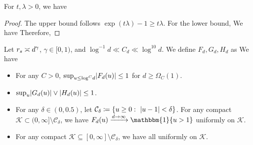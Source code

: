 \begin{proposition}
\label{prop:auxbound}
For $t, \lambda > 0$, we have
\end{proposition}

\begin{proof}
The upper bound follows  $\exp(t \lambda) - 1 \geq t \lambda$. For the lower bound,
We have
Therefore,
\end{proof}


 

\begin{lemma}
\label{lem:asympkernel}
Let $r_s \asymp d^{\gamma}$, $\gamma \in [0,1)$, and $\log^{-1} d \ll C_d \ll \log^{10} d $.  We define   $F_d, G_d, H_d$ as
  We have
\begin{itemize}
\item For any $C > 0$,   $ \sup_{u \leq \log^{C} \! d}  \lvert F_d(u)  \rvert \leq 1$ for $d \geq \Omega_{C}(1)$.
\item  $ \sup_{u}  \lvert G_d(u)  \rvert \vee  \lvert H_d(u)  \rvert \leq 1$.
\item For any   $\delta \in (0,0.5)$, let  $\mathcal{C}_{\delta} \coloneqq \{  u \geq 0 : ~ \lvert u - 1\rvert < \delta  \}$.   For any compact $\mathcal{K} \subset   (0,\infty]  \setminus  \mathcal{C}_{\delta}$, we have $F_d(u) \xrightarrow{d \to \infty} \mathbbm{1} \{ u > 1 \}$
 uniformly on $\mathcal{K}.$ 
\item   For any compact $\mathcal{K} \subseteq  [0,\infty]  \setminus    \mathcal{C}_{\delta}$, we have
all uniformly on $\mathcal{K}.$ 
\end{itemize}
\end{lemma}


